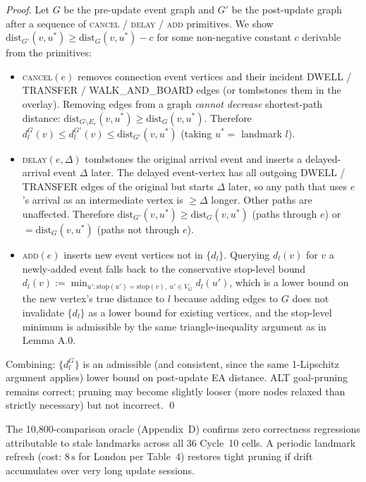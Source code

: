 \documentclass[letterpaper]{article}
\begin{document}
\emph{Proof.} Let $G$ be the pre-update event graph and $G'$ be
the post-update graph after a sequence of \textsc{cancel} /
\textsc{delay} / \textsc{add} primitives. We show
$\text{dist}_{G'}(v, u^*) \geq \text{dist}_G(v, u^*) - c$ for some
non-negative constant $c$ derivable from the primitives:

\begin{itemize}
\item \textsc{cancel}$(e)$ removes connection event vertices and
their incident DWELL / TRANSFER / WALK\_AND\_BOARD edges (or
tombstones them in the overlay). Removing edges from a graph
\emph{cannot decrease} shortest-path distance:
$\text{dist}_{G \setminus E_e}(v, u^*) \geq \text{dist}_G(v, u^*)$.
Therefore $d_l^G(v) \leq d_l^{G'}(v) \leq \text{dist}_{G'}(v, u^*)$
(taking $u^* = $ landmark $l$).
\item \textsc{delay}$(e, \Delta)$ tombstones the original arrival
event and inserts a delayed-arrival event $\Delta$ later. The
delayed event-vertex has all outgoing DWELL / TRANSFER edges of
the original but starts $\Delta$ later, so any path that uses
$e$'s arrival as an intermediate vertex is $\geq \Delta$ longer.
Other paths are unaffected. Therefore
$\text{dist}_{G'}(v, u^*) \geq \text{dist}_G(v, u^*)$ (paths
through $e$) or $= \text{dist}_G(v, u^*)$ (paths not through $e$).
\item \textsc{add}$(e)$ inserts new event vertices not in $\{d_l\}$.
Querying $d_l(v)$ for $v$ a newly-added event falls back to the
conservative stop-level bound
$d_l(v) := \min_{u' : \text{stop}(u') = \text{stop}(v),~u' \in V_G} d_l(u')$,
which is a lower bound on the new vertex's true distance to $l$
because adding edges to $G$ does not invalidate $\{d_l\}$ as a
lower bound for existing vertices, and the stop-level minimum is
admissible by the same triangle-inequality argument as in
Lemma A.0.
\end{itemize}

Combining: $\{d_l^G\}$ is an admissible (and consistent, since
the same 1-Lipschitz argument applies) lower bound on post-update
EA distance. ALT goal-pruning remains correct; pruning may become
slightly looser (more nodes relaxed than strictly necessary) but
not incorrect. \qed

The 10{,}800-comparison oracle (Appendix~D) confirms zero
correctness regressions attributable to stale landmarks across all
36 Cycle~10 cells. A periodic landmark refresh (cost:
$8\,\mathrm{s}$ for London per Table~4) restores tight pruning if
drift accumulates over very long update sessions.
\end{document}
